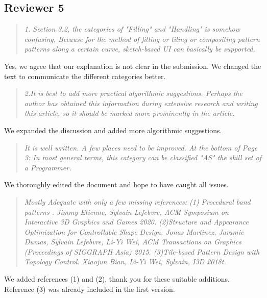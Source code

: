 \documentclass{egpubl}
\newcommand{\rev}[2]{{\color{greenrev}\textsuperscript{#1}#2}}
\renewcommand{\rev}[2]{{#2}}
\begin{document}
\subsection*{Reviewer 5} 

\begin{quote}
\emph{1. Section 3.2, the categories of "Filling" and "Handling" is somehow confusing, Because for the method of filling or tiling or compositing pattern patterns along a certain curve, sketch-based UI can basically be supported.}
\end{quote}

\rev{}{Yes, we agree that our explanation is not clear in the submission. We changed the text to communicate the different categories better.}

\begin{quote}
\emph{2.It is best to add more practical algorithmic suggestions. Perhaps the author has obtained this information during extensive research and writing this article, so it should be marked more prominently in the article.}
\end{quote}

\rev{}{We expanded the discussion and added more algorithmic suggestions.}

\begin{quote}
\emph{It is well written.  A few places need to be improved.
At the bottom of Page 3:  In most general terms, this category can be classified  "AS" the skill set of a Programmer.}
\end{quote}

\rev{}{We thoroughly edited the document and hope to have caught all issues.}


\begin{quote}
\emph{Mostly Adequate with only a few missing references: (1) Procedural band patterns . Jimmy Etienne, Sylvain Lefebvre, ACM Symposium on Interactive 3D Graphics and Games 2020. (2)Structure and Appearance Optimization for Controllable Shape Design. Jonas Martinez, Jaramie Dumas, Sylvain Lefebvre, Li-Yi Wei, ACM Transactions on Graphics (Proceedings of SIGGRAPH Asia) 2015. (3)Tile-based Pattern Design with Topology Control. Xiaojun Bian, Li-Yi Wei, Sylvain, I3D 2018t.}
\end{quote}


\rev{}{
    We added references (1) and (2), thank you for these suitable additions. Reference (3) was already included in the first version.
}



%  
%        




\end{document}
